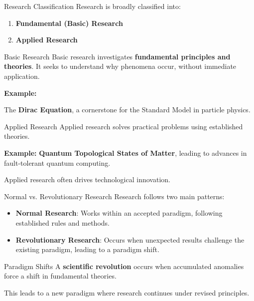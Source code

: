 \begin{frame}{Research Classification}
  Research is broadly classified into:
  \begin{enumerate}
    \item \textbf{Fundamental (Basic) Research}
    \item \textbf{Applied Research}
  \end{enumerate}
\end{frame}

\begin{frame}{Basic Research}
  Basic research investigates \textbf{fundamental principles and theories}.
  It seeks to understand why phenomena occur, without immediate application.

  \textbf{Example:}

  The \textbf{Dirac Equation}, a cornerstone for the Standard Model
  in particle physics.
\end{frame}

\begin{frame}{Applied Research}
  Applied research solves practical problems using established theories.

  \textbf{Example:}
  \textbf{Quantum Topological States of Matter}, leading to advances
  in fault-tolerant quantum computing. \cite{Stanescu2017}

  Applied research often drives technological innovation.
\end{frame}

\begin{frame}{Normal vs. Revolutionary Research}
  Research follows two main patterns:
  \begin{itemize}
    \item \textbf{Normal Research}: Works within an accepted paradigm,
      following established rules and methods.
    \item \textbf{Revolutionary Research}: Occurs when unexpected results
      challenge the existing paradigm, leading to a paradigm shift.
  \end{itemize}
\end{frame}

\begin{frame}{Paradigm Shifts}
  A \textbf{scientific revolution} occurs when accumulated anomalies force
  a shift in fundamental theories.

  This leads to a new paradigm where research
  continues under revised principles.
\end{frame}

